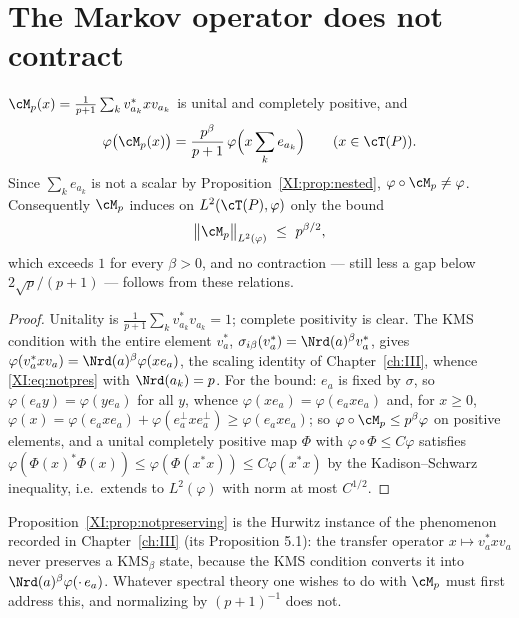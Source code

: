 \section{The Markov operator does not contract}

\begin{proposition}\label{XI:prop:notpreserving}
$\cM_p(x)=\frac{1}{p+1}\sum_kv_{a_k}^*xv_{a_k}$ is unital and completely positive, and
\begin{equation}\label{XI:eq:notpres}
\varphi\bigl(\cM_p(x)\bigr)=\frac{p^{\beta}}{p+1}\,\varphi\Bigl(x\sum_{k}e_{a_k}\Bigr)
\qquad(x\in\cT(P)).
\end{equation}
Since $\sum_ke_{a_k}$ is not a scalar by Proposition~\ref{XI:prop:nested}, $\varphi\circ\cM_p\ne\varphi$.
Consequently $\cM_p$ induces on $L^2(\cT(P),\varphi)$ only the bound
\[
\bigl\|\cM_p\bigr\|_{L^2(\varphi)}\ \le\ p^{\beta/2},
\]
which exceeds $1$ for every $\beta>0$, and no contraction --- still less a gap below
$2\sqrt p/(p+1)$ --- follows from these relations.
\end{proposition}

\begin{proof}
Unitality is $\frac1{p+1}\sum_kv_{a_k}^*v_{a_k}=1$; complete positivity is clear. The KMS
condition with the entire element $v_a^*$, $\sigma_{i\beta}(v_a^*)=\Nrd(a)^{\beta}v_a^*$,
gives $\varphi(v_a^*xv_a)=\Nrd(a)^{\beta}\varphi(xe_a)$, the scaling identity of Chapter~\ref{ch:III},
whence \eqref{XI:eq:notpres} with $\Nrd(a_k)=p$. For the bound: $e_a$ is fixed by $\sigma$, so
$\varphi(e_ay)=\varphi(ye_a)$ for all $y$, whence $\varphi(xe_a)=\varphi(e_axe_a)$ and, for
$x\ge0$, $\varphi(x)=\varphi(e_axe_a)+\varphi(e_a^\perp xe_a^\perp)\ge\varphi(e_axe_a)$; so
$\varphi\circ\cM_p\le p^{\beta}\varphi$ on positive elements, and a unital completely positive
map $\Phi$ with $\varphi\circ\Phi\le C\varphi$ satisfies
$\varphi(\Phi(x)^*\Phi(x))\le\varphi(\Phi(x^*x))\le C\varphi(x^*x)$ by the Kadison--Schwarz
inequality, i.e.\ extends to $L^2(\varphi)$ with norm at most $C^{1/2}$.
\end{proof}

\begin{remark}\label{XI:rem:sameas}
Proposition~\ref{XI:prop:notpreserving} is the Hurwitz instance of the phenomenon recorded in
Chapter~\ref{ch:III} (its Proposition 5.1): the transfer operator $x\mapsto v_a^*xv_a$ never preserves a
$\mathrm{KMS}_\beta$ state, because the KMS condition converts it into
$\Nrd(a)^\beta\varphi(\cdot\,e_a)$. Whatever spectral theory one wishes to do with $\cM_p$
must first address this, and normalizing by $(p+1)^{-1}$ does not.
\end{remark}

